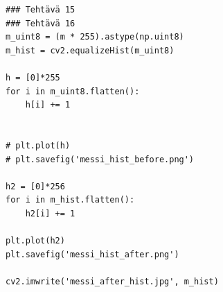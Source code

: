 \documentclass{article}
\begin{document}
\begin{verbatim}
### Tehtävä 15
### Tehtävä 16
m_uint8 = (m * 255).astype(np.uint8)
m_hist = cv2.equalizeHist(m_uint8)

h = [0]*255
for i in m_uint8.flatten():
    h[i] += 1
    

# plt.plot(h)
# plt.savefig('messi_hist_before.png')

h2 = [0]*256
for i in m_hist.flatten():
    h2[i] += 1

plt.plot(h2)
plt.savefig('messi_hist_after.png')

cv2.imwrite('messi_after_hist.jpg', m_hist)
\end{verbatim}
\end{document}
